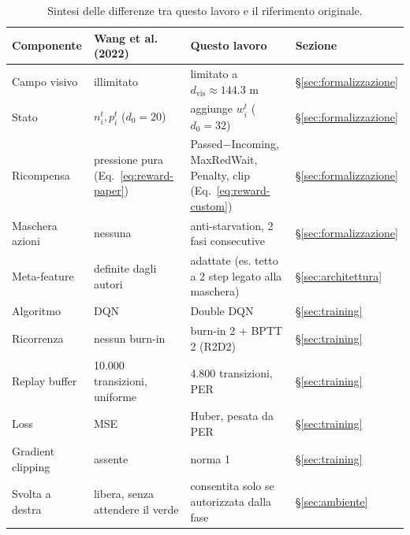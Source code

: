 \begin{table}[htbp]
  \centering
  \small
  \begin{tabular}{@{}p{3.9cm}p{4.2cm}p{4.2cm}l@{}}
    \toprule
    Componente        & Wang et al. (2022)                         & Questo lavoro                                                             & Sezione                    \\
    \midrule
    Campo visivo      & illimitato                                 & limitato a $d_{\text{vis}}\approx144.3$ m                                 & §\ref{sec:formalizzazione} \\
    Stato             & $n_i^t, p_i^t$ ($d_0=20$)                  & aggiunge $w_i^t$ ($d_0=32$)                                               & §\ref{sec:formalizzazione} \\
    Ricompensa        & pressione pura (Eq.~\ref{eq:reward-paper}) & Passed$-$Incoming, MaxRedWait, Penalty, clip (Eq.~\ref{eq:reward-custom}) & §\ref{sec:formalizzazione} \\
    Maschera azioni   & nessuna                                    & anti-starvation, 2 fasi consecutive                                       & §\ref{sec:formalizzazione} \\
    Meta-feature      & definite dagli autori                      & adattate (es. tetto a 2 step legato alla maschera)                        & §\ref{sec:architettura}    \\
    Algoritmo         & DQN                                        & Double DQN                                                                & §\ref{sec:training}        \\
    Ricorrenza        & nessun burn-in                             & burn-in 2 + BPTT 2 (R2D2)                                                 & §\ref{sec:training}        \\
    Replay buffer     & 10.000 transizioni, uniforme               & 4.800 transizioni, PER                                                    & §\ref{sec:training}        \\
    Loss              & MSE                                        & Huber, pesata da PER                                                      & §\ref{sec:training}        \\
    Gradient clipping & assente                                    & norma 1                                                                   & §\ref{sec:training}        \\
    Svolta a destra   & libera, senza attendere il verde           & consentita solo se autorizzata dalla fase                                 & §\ref{sec:ambiente}        \\
    \bottomrule
  \end{tabular}
  \caption{Sintesi delle differenze tra questo lavoro e il riferimento originale.}
  \label{tab:differenze}
\end{table}

